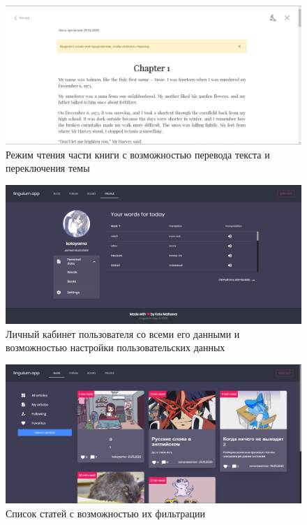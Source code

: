 \begin{figure}[h]
	\centering
	\includegraphics[width=\textwidth]{figures/reading}
	\caption{Режим чтения части книги с возможностью перевода текста и переключения темы}
	\label{fig:reading}
\end{figure}

\begin{figure}[h]
	\centering
	\includegraphics[width=\textwidth]{figures/profile}
	\caption{Личный кабинет пользователя со всеми его данными и возможностью настройки пользовательских данных}
	\label{fig:profile}
\end{figure}

\begin{figure}[h]
	\centering
	\includegraphics[width=\textwidth]{figures/articlelist}
	\caption{Список статей с возможностью их фильтрации}
	\label{fig:articlelist}
\end{figure}

